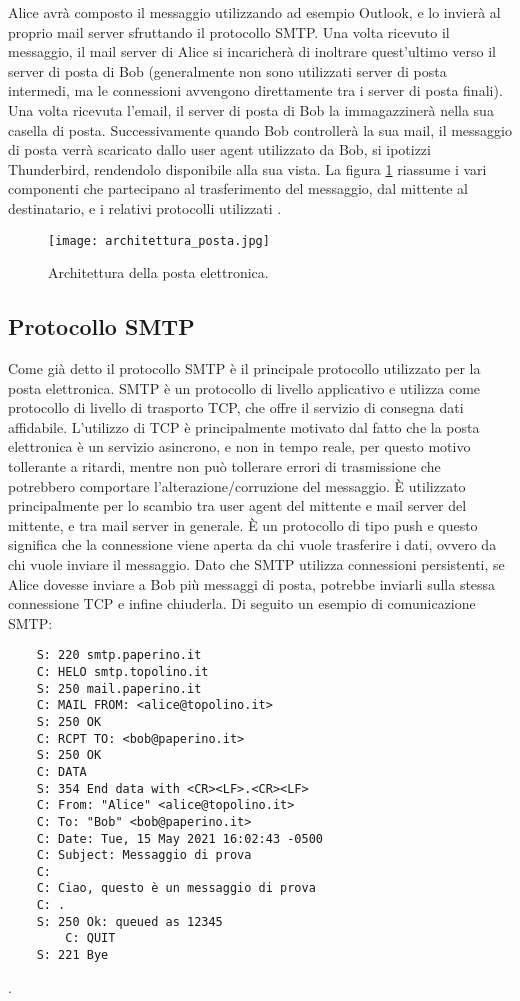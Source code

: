 Alice avrà composto il messaggio utilizzando ad esempio Outlook, e lo invierà al proprio mail server 
sfruttando il protocollo SMTP. Una volta ricevuto il messaggio, il mail server di Alice si incaricherà di 
inoltrare quest'ultimo verso il server di posta di Bob (generalmente non sono utilizzati server di posta intermedi, 
ma le connessioni avvengono direttamente tra i server di posta finali). 
Una volta ricevuta l'email, il server di posta di Bob la immagazzinerà nella sua casella di posta. 
Successivamente quando Bob controllerà la sua mail, il messaggio di posta verrà scaricato dallo user agent 
utilizzato da Bob, si ipotizzi Thunderbird, rendendolo disponibile alla sua vista.
La figura \ref{architetturaPosta} riassume i vari componenti che partecipano al trasferimento del messaggio, dal
mittente al destinatario, e i relativi protocolli utilizzati \cite{kurose2008reti}.

\begin{figure}[htp]
    \centering
    \texttt{[image: architettura\_posta.jpg]}
        \caption{Architettura della posta elettronica.}\label{architetturaPosta}
  \end{figure}


\subsection{Protocollo SMTP}
Come già detto il protocollo SMTP è il principale protocollo utilizzato per la posta elettronica.
SMTP è un protocollo di livello applicativo e utilizza come protocollo di livello di trasporto TCP,
che offre il servizio di consegna dati affidabile. 
L'utilizzo di TCP è principalmente motivato dal fatto che la posta elettronica è un servizio asincrono, 
e non in tempo reale, per questo motivo tollerante a ritardi, mentre non può tollerare errori di trasmissione 
che potrebbero comportare l'alterazione/corruzione del messaggio. 
È utilizzato principalmente per lo scambio tra user agent del mittente e mail server del mittente, e tra mail server 
in generale. È un protocollo di tipo push e questo significa che la connessione viene aperta da chi vuole 
trasferire i dati, ovvero da chi vuole inviare il messaggio. Dato che SMTP utilizza connessioni persistenti, 
se Alice dovesse inviare a Bob più messaggi di posta, potrebbe inviarli sulla stessa connessione TCP e 
infine chiuderla.
Di seguito un esempio di comunicazione SMTP:
\pagebreak
\begin{verbatim}
    S: 220 smtp.paperino.it
    C: HELO smtp.topolino.it
    S: 250 mail.paperino.it
    C: MAIL FROM: <alice@topolino.it>
    S: 250 OK
    C: RCPT TO: <bob@paperino.it>
    S: 250 OK
    C: DATA
    S: 354 End data with <CR><LF>.<CR><LF>
    C: From: "Alice" <alice@topolino.it>
    C: To: "Bob" <bob@paperino.it>
    C: Date: Tue, 15 May 2021 16:02:43 -0500
    C: Subject: Messaggio di prova
    C: 
    C: Ciao, questo è un messaggio di prova
    C: .
    S: 250 Ok: queued as 12345
        C: QUIT
    S: 221 Bye
\end{verbatim}\cite{SMTP}.

